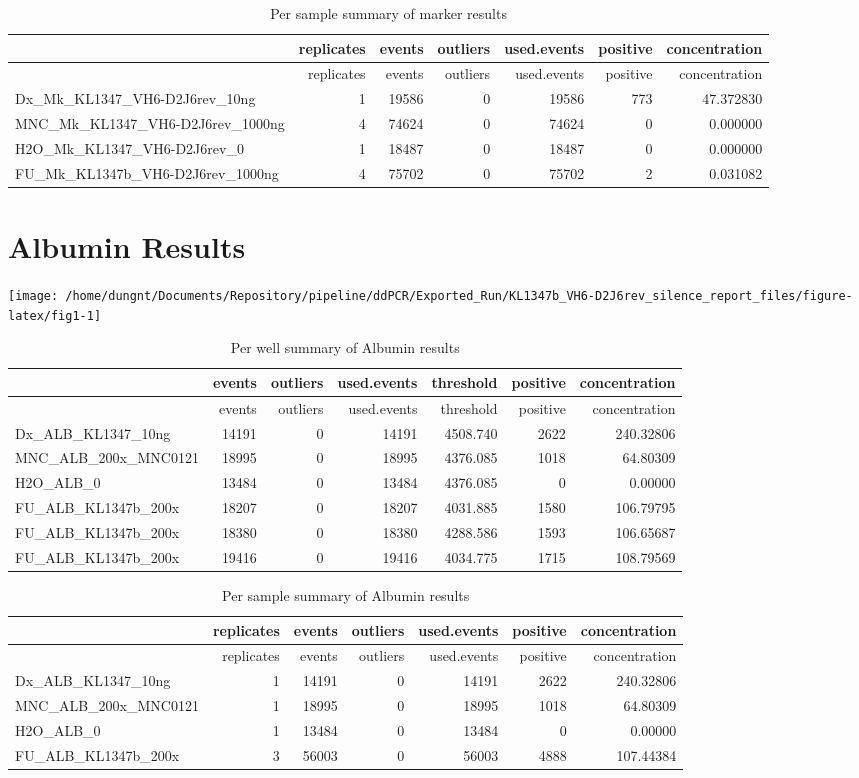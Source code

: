 \documentclass[
  10pt,
]{article}
\begin{document}
\begin{longtable}[]{@{}lrrrrrr@{}}
\caption{Per sample summary of marker results}\tabularnewline
\toprule
& replicates & events & outliers & used.events & positive &
concentration\tabularnewline
\midrule
\endfirsthead
\toprule
& replicates & events & outliers & used.events & positive &
concentration\tabularnewline
\midrule
\endhead
Dx\_Mk\_KL1347\_VH6-D2J6rev\_10ng & 1 & 19586 & 0 & 19586 & 773 &
47.372830\tabularnewline
MNC\_Mk\_KL1347\_VH6-D2J6rev\_1000ng & 4 & 74624 & 0 & 74624 & 0 &
0.000000\tabularnewline
H2O\_Mk\_KL1347\_VH6-D2J6rev\_0 & 1 & 18487 & 0 & 18487 & 0 &
0.000000\tabularnewline
FU\_Mk\_KL1347b\_VH6-D2J6rev\_1000ng & 4 & 75702 & 0 & 75702 & 2 &
0.031082\tabularnewline
\bottomrule
\end{longtable}

\newpage

\hypertarget{albumin-results}{%
\section{Albumin Results}\label{albumin-results}}

\begin{center}\texttt{[image: /home/dungnt/Documents/Repository/pipeline/ddPCR/Exported\_Run/KL1347b\_VH6-D2J6rev\_silence\_report\_files/figure-latex/fig1-1]} \end{center}

\begin{longtable}[]{@{}lrrrrrr@{}}
\caption{Per well summary of Albumin results}\tabularnewline
\toprule
& events & outliers & used.events & threshold & positive &
concentration\tabularnewline
\midrule
\endfirsthead
\toprule
& events & outliers & used.events & threshold & positive &
concentration\tabularnewline
\midrule
\endhead
Dx\_ALB\_KL1347\_10ng & 14191 & 0 & 14191 & 4508.740 & 2622 &
240.32806\tabularnewline
MNC\_ALB\_200x\_MNC0121 & 18995 & 0 & 18995 & 4376.085 & 1018 &
64.80309\tabularnewline
H2O\_ALB\_0 & 13484 & 0 & 13484 & 4376.085 & 0 & 0.00000\tabularnewline
FU\_ALB\_KL1347b\_200x & 18207 & 0 & 18207 & 4031.885 & 1580 &
106.79795\tabularnewline
FU\_ALB\_KL1347b\_200x & 18380 & 0 & 18380 & 4288.586 & 1593 &
106.65687\tabularnewline
FU\_ALB\_KL1347b\_200x & 19416 & 0 & 19416 & 4034.775 & 1715 &
108.79569\tabularnewline
\bottomrule
\end{longtable}

\begin{longtable}[]{@{}lrrrrrr@{}}
\caption{Per sample summary of Albumin results}\tabularnewline
\toprule
& replicates & events & outliers & used.events & positive &
concentration\tabularnewline
\midrule
\endfirsthead
\toprule
& replicates & events & outliers & used.events & positive &
concentration\tabularnewline
\midrule
\endhead
Dx\_ALB\_KL1347\_10ng & 1 & 14191 & 0 & 14191 & 2622 &
240.32806\tabularnewline
MNC\_ALB\_200x\_MNC0121 & 1 & 18995 & 0 & 18995 & 1018 &
64.80309\tabularnewline
H2O\_ALB\_0 & 1 & 13484 & 0 & 13484 & 0 & 0.00000\tabularnewline
FU\_ALB\_KL1347b\_200x & 3 & 56003 & 0 & 56003 & 4888 &
107.44384\tabularnewline
\bottomrule
\end{longtable}
\end{document}
